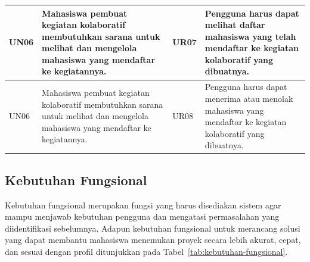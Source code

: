 \begin{longtable}{p{1.5cm} p{4cm} p{1.5cm} p{\dimexpr\linewidth-7cm-8\tabcolsep\relax}}
    \midrule
  UN06 & Mahasiswa pembuat kegiatan kolaboratif membutuhkan sarana untuk melihat dan mengelola mahasiswa yang mendaftar ke kegiatannya. & UR07 & Pengguna harus dapat melihat daftar mahasiswa yang telah mendaftar ke kegiatan kolaboratif yang dibuatnya. \\
    \midrule
  UN06 & Mahasiswa pembuat kegiatan kolaboratif membutuhkan sarana untuk melihat dan mengelola mahasiswa yang mendaftar ke kegiatannya. & UR08 & Pengguna harus dapat menerima atau menolak mahasiswa yang mendaftar ke kegiatan kolaboratif yang dibuatnya. \\
\end{longtable}

\subsection{Kebutuhan Fungsional}

Kebutuhan fungsional merupakan fungsi yang harus disediakan sistem agar mampu menjawab kebutuhan pengguna dan mengatasi permasalahan yang diidentifikasi sebelumnya. Adapun kebutuhan fungsional untuk merancang solusi yang dapat membantu mahasiswa menemukan proyek secara lebih akurat, cepat, dan sesuai dengan profil ditunjukkan pada Tabel~\ref{tab:kebutuhan-fungsional}.

